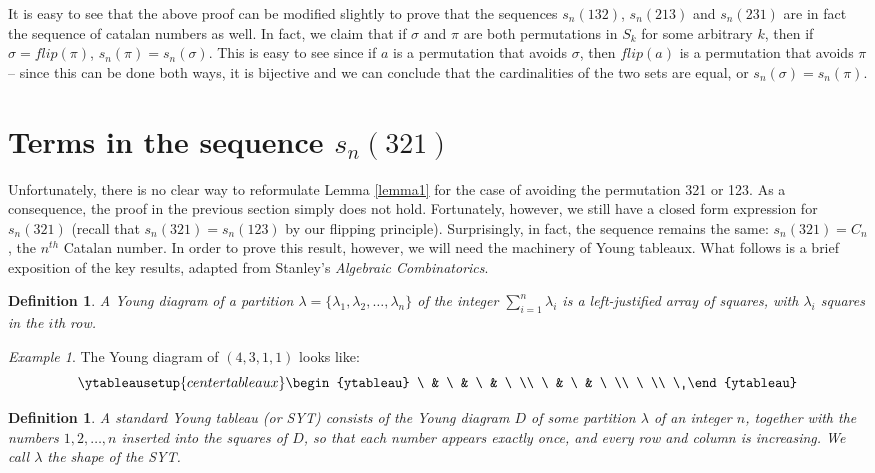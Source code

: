 \documentclass[11pt,letterpaper,twoside,english]{article}
\theoremstyle{theorem}
\newtheorem{definition}[theorem]{Definition}
\theoremstyle{remark}
\newtheorem{example}{Example}
\begin{document}
It is easy to see that the above proof can be modified slightly to prove that the sequences $s_n(132)$, $s_n(213)$ and $s_n(231)$ are in fact the sequence of catalan numbers as well. In fact, we claim that if $\sigma$ and $\pi$ are both permutations in $S_k$ for some arbitrary $k$, then if $\sigma = flip(\pi)$, $s_n(\pi) = s_n(\sigma)$. This is easy to see since if $a$ is a permutation that avoids $\sigma$, then $flip(a)$ is a permutation that avoids $\pi$ -- since this can be done both ways, it is bijective and we can conclude that the cardinalities of the two sets are equal, or $s_n(\sigma) = s_n(\pi)$.

\section{Terms in the sequence $s_n(321)$}

Unfortunately, there is no clear way to reformulate Lemma \ref{lemma1} for the case of avoiding the permutation 321 or 123. As a consequence, the proof in the previous section simply does not hold. Fortunately, however, we still have a closed form expression for $s_n(321)$ (recall that $s_n(321)=s_n(123)$ by our flipping principle). Surprisingly, in fact, the sequence remains the same: $s_n(321)=C_n$, the $n^{th}$ Catalan number. In order to prove this result, however, we will need the machinery of Young tableaux. What follows is a brief exposition of the key results, adapted from Stanley's \emph{Algebraic Combinatorics}.

\begin{definition}
A Young diagram of a partition $\lambda=\{\lambda_1, \lambda_2, \ldots, \lambda_n\}$ of the integer $\sum_{i=1}^n \lambda_i$ is a left-justified array of squares, with $\lambda_i$ squares in the $i$th row.
\end{definition}
\begin{example}
The Young diagram of $(4, 3, 1, 1)$ looks like:
\[
\ytableausetup{centertableaux}
\begin{ytableau}
\ & \ & \ & \ \\
\ & \ & \ \\
\ \\
\
\end{ytableau}
\]
\end{example}

\begin{definition}
A standard Young tableau (or SYT) consists of the Young diagram $D$ of some partition $\lambda$ of an integer $n$, together with the numbers $1, 2, \ldots, n$ inserted into the squares of $D$, so that each number appears exactly once, and every row and column is \emph{increasing}. We call $\lambda$ the \emph{shape} of the SYT.
\end{definition}
\end{document}
